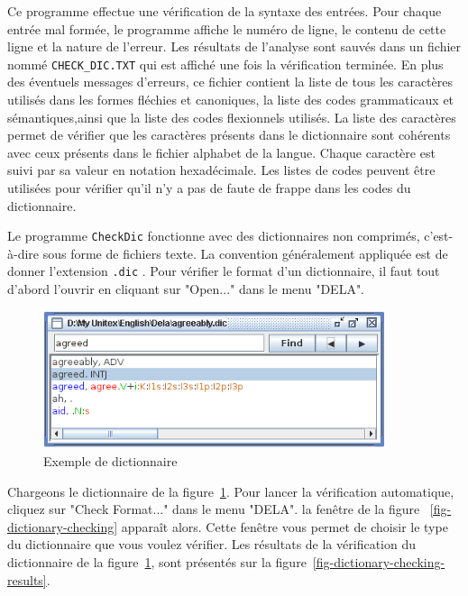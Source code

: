 \bigskip
\noindent Ce programme effectue une vérification de la syntaxe des entrées. Pour chaque entrée
mal formée, le programme affiche le numéro de ligne, le contenu de cette ligne et la nature
de l’erreur. Les résultats de l’analyse sont sauvés dans un fichier nommé
\verb+CHECK_DIC.TXT+ qui est affiché une fois la vérification
terminée. En plus des éventuels messages d’erreurs, ce fichier contient la liste de tous les
caractères utilisés dans les formes fléchies et canoniques, la liste des codes grammaticaux et
sémantiques,ainsi que la liste des codes flexionnels utilisés.
La liste des caractères permet de vérifier que les caractères présents dans le dictionnaire
sont cohérents avec ceux présents dans le fichier alphabet de la langue. Chaque caractère est
suivi par sa valeur en notation hexadécimale. Les listes de codes peuvent être utilisées pour
vérifier qu’il n’y a pas de faute de frappe dans les codes du dictionnaire.


\bigskip
\noindent Le programme \verb+CheckDic+ fonctionne avec des dictionnaires non comprimés, c’est-à-dire
sous forme de fichiers texte. La convention généralement appliquée est de donner l’extension
\verb+.dic+ . Pour vérifier le format d’un dictionnaire, il faut tout
d’abord l’ouvrir en cliquant sur "Open..." dans le menu "DELA".


\begin{figure}[h]
\begin{center}
\includegraphics[width=10cm]{resources/img/fig3-4.png}
\caption{Exemple de dictionnaire\label{fig-dictionary-example}}
\end{center}
\end{figure}

\noindent Chargeons le dictionnaire de la figure~\ref{fig-dictionary-example}.
Pour lancer la vérification automatique, cliquez sur "Check Format..." dans le menu "DELA".
la fenêtre de la figure ~\ref{fig-dictionary-checking} apparaît alors.
Cette fenêtre vous permet de choisir le type du dictionnaire que vous voulez vérifier. Les
résultats de la vérification du dictionnaire de la figure~\ref{fig-dictionary-example},
 sont présentés sur la figure~\ref{fig-dictionary-checking-results}.

